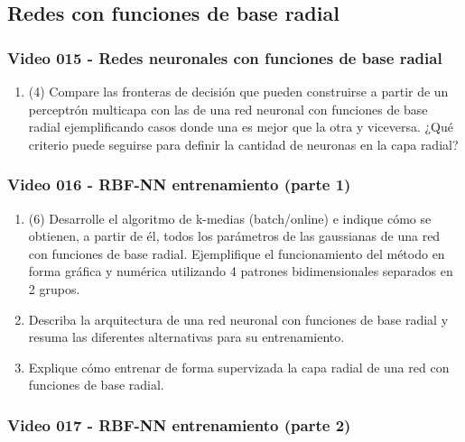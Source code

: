\documentclass[a4paper,10pt,spanish,oneside]{article}
\begin{document}
\subsection{Redes con funciones de base radial}

\subsubsection{Video 015 - Redes neuronales con funciones de base radial}

\begin{enumerate}
\item (4) Compare las fronteras de decisión que pueden construirse a partir de un perceptrón multicapa con las de una red neuronal con funciones de base radial ejemplificando casos donde una es mejor que la otra y viceversa. ¿Qué criterio puede seguirse para definir la cantidad de neuronas en la capa radial?
\end{enumerate}

\subsubsection{Video 016 - RBF-NN entrenamiento (parte 1)}

\begin{enumerate}
\item (6) Desarrolle el algoritmo de k-medias (batch/online) e indique cómo se obtienen, a partir de él, todos los parámetros de las gaussianas de una red con funciones de base radial. Ejemplifique el funcionamiento del método en forma gráfica y numérica utilizando 4 patrones bidimensionales separados en 2 grupos.

\item Describa la arquitectura de una red neuronal con funciones de base radial y resuma las diferentes alternativas para su entrenamiento.

\item Explique cómo entrenar de forma supervizada la capa radial de una red con funciones de base radial.
\end{enumerate}

\subsubsection{Video 017 - RBF-NN entrenamiento (parte 2)}
\end{document}
